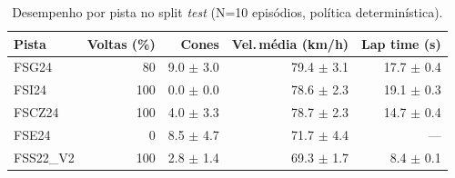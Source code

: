\begin{table}[H]
\centering
\caption{Desempenho por pista no split \textit{test} (N=10 episódios, política determinística).}
\label{tab:per_track_test}
\begin{tabular}{lrrrr}
\toprule
\textbf{Pista} & \textbf{Voltas (\%)} & \textbf{Cones} & \textbf{Vel.\,m\'edia (km/h)} & \textbf{Lap time (s)} \\
\midrule
FSG24 & 80 & 9.0 $\pm$ 3.0 & 79.4 $\pm$ 3.1 & 17.7 $\pm$ 0.4 \\
FSI24 & 100 & 0.0 $\pm$ 0.0 & 78.6 $\pm$ 2.3 & 19.1 $\pm$ 0.3 \\
FSCZ24 & 100 & 4.0 $\pm$ 3.3 & 78.7 $\pm$ 2.3 & 14.7 $\pm$ 0.4 \\
FSE24 & 0 & 8.5 $\pm$ 4.7 & 71.7 $\pm$ 4.4 & --- \\
FSS22_V2 & 100 & 2.8 $\pm$ 1.4 & 69.3 $\pm$ 1.7 & 8.4 $\pm$ 0.1 \\
\bottomrule
\end{tabular}
\end{table}
